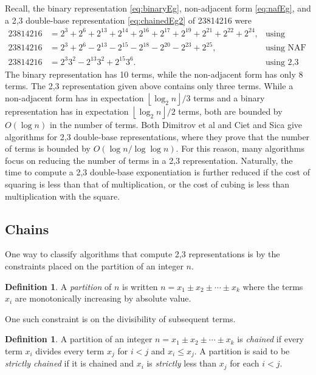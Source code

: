 \documentclass{ucalgthes1}
\theoremstyle{definition}
\newtheorem{defn}[thm]{Definition}
\newcommand{\floor}[1]{\left\lfloor #1 \right\rfloor}
\begin{document}
Recall, the binary representation \eqref{eq:binaryEg}, non-adjacent form \eqref{eq:nafEg}, and a 2,3 double-base representation \eqref{eq:chainedEg2} of 23814216 were
\begin{align*}
	23814216 &= 2^3+2^6+2^{13}+2^{14}+2^{16}+2^{17}+2^{19}+2^{21}+2^{22}+2^{24}, & \mbox{using binary} \\
	23814216 &= 2^3+2^6-2^{13}-2^{15}-2^{18}-2^{20}-2^{23}+2^{25}, & \mbox{using NAF} \\
	23814216 &= 2^3 3^2 -2^{13} 3^2 +2^{15} 3^6. & \mbox{using 2,3 DBNS}
\end{align*}
The binary representation has 10 terms, while the non-adjacent form has only 8 terms.  The 2,3 representation given above contains only three terms.  While a non-adjacent form has in expectation $\floor{\log_2 n}/3$ terms and a binary representation has in expectation $\floor{\log_2 n}/2$ terms, both are bounded by $O(\log n)$ in the number of terms.  Both Dimitrov et al \cite{Dimitrov2008} and Ciet and Sica \cite{Ciet2005} give algorithms for 2,3 double-base representations, where they prove that the number of terms is bounded by $O(\log n / \log \log n)$.  For this reason, many algorithms focus on reducing the number of terms in a 2,3 representation.   Naturally, the time to compute a 2,3 double-base exponentiation is further reduced if the cost of squaring is less than that of multiplication, or the cost of cubing is less than multiplication with the square.

\bigbreak
\subsection{Chains}
\label{subsec:dbnsChains}


One way to classify algorithms that compute 2,3 representations is by the constraints placed on the partition of an integer $n$.

\begin{defn}
A \emph{partition} of $n$ is written $n = x_1 \pm x_2 \pm \cdots \pm x_k$ where the terms $x_i$ are monotonically increasing by absolute value.
\end{defn}

\noindent
One such constraint is on the divisibility of subsequent terms.

\begin{defn}
\label{defn:chained}
A partition of an integer $n = x_1 \pm x_2 \pm \cdots \pm x_k$ is \emph{chained} if every term $x_i$ divides every term $x_j$ for $i < j$ and $x_i \le x_j$. A partition is said to be \emph{strictly chained} if it is chained and $x_i$ is \emph{strictly} less than $x_j$ for each $i < j$.
\end{defn}
\end{document}
